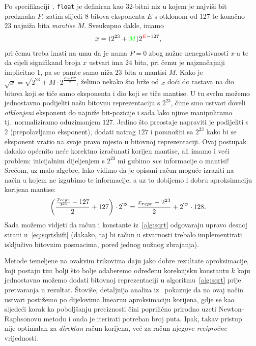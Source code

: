 \documentclass[12pt]{scrartcl}
\begin{document}
Po specifikaciji~\cite{goldberg}, \texttt{float} je definiran kao $32$-bitni niz u kojem je najviši bit predznaka $P$,
zatim slijedi $8$ bitova eksponenta $E$ s otklonom od $127$ te konačno $23$ najniža bita \emph{mantise} $M$. Sveukupno dakle, imamo 
\begin{equation}
    x = (2^{23} + \textcolor{green}{M})2^{\textcolor{red}{E}-127},
\end{equation}
pri čemu treba imati na umu da je nama $P=0$ zbog nužne nenegativnosti $x$-a te da
 cijeli signifikand broja $x$ ustvari ima $24$ bita, pri čemu je najznačajniji implicitno $1$, pa se pamte
samo niža $23$ bita u mantisi $M$. Kako je $\sqrt{x} = \sqrt{2^{23}+M}\cdot 2^{\frac{E-127}{2}}$, želimo nekako što brže 
od $x$ doći do rastava na dio bitova koji se tiče samo eksponenta i dio koji se tiče mantise. U tu svrhu možemo jednostavno
podijeliti našu bitovnu reprezentaciju s $2^{23}$, čime smo ustvari doveli \emph{otklonjeni} eksponent do najniže bit-pozicije i sada
lako njime manipuliramo tj.\ normaliziramo oduzimanjem $127$. Jedino što preostaje napraviti je podijeliti s $2$ (prepolavljamo eksponent),
dodati natrag $127$ i pomnožiti sa $2^{23}$ kako bi se eksponent vratio na svoje pravo mjesto u bitovnoj reprezentaciji. Ovaj postupak
dakako općenito neće korektno izračunati korijen mantise, ali imamo i veći problem: inicijalnim dijeljenjem s $2^{23}$ mi gubimo \emph{sve} informacije
o mantisi! Srećom, uz malo algebre, lako vidimo da je opisani račun moguće izraziti na način u kojem ne izgubimo te informacije, a uz to dobijemo
i dobru aproksimaciju korijena mantise:
\begin{equation}\label{eq:sqrtshift}
    \left(\frac{\frac{x_{repr}}{2^{23}} - 127}{2} + 127\right) \cdot 2^{23} = \frac{x_{repr} - 2^{23}}{2} + 2^{22}\cdot 128\text.
\end{equation}
Sada možemo vidjeti da račun i konstante iz~\ref{alg:sqrt} odgovaraju upravo desnoj strani u~\eqref{eq:sqrtshift} (dakako, taj bi račun u 
stvarnosti trebalo implementirati isključivo bitovnim posmacima, pored jednog nužnog zbrajanja).

Metode temeljene na ovakvim trikovima daju jako dobre rezultate aproksimacije, koji postaju tim bolji što bolje odaberemo
određenu korekcijsku konstantu $k$ koju jednostavno možemo dodati bitovnoj reprezentaciji u 
algoritmu~\ref{alg:sqrt} prije pretvaranja u rezultat. Štoviše, detaljnija analiza iz~\cite{lomont} 
 pokazuje da na ovaj način ustvari postižemo po dijelovima linearnu aproksimaciju korijena, gdje se kao sljedeći korak ka poboljšanju
 preciznosti čini poprilično prirodno uzeti Newton-Raphsonovu metodu i onda je iterirati potreban broj puta. Ipak, takav pristup nije optimalan
 za \emph{direktan} račun korijena, već za račun njegove \emph{recipročne} vrijednosti.
\end{document}
